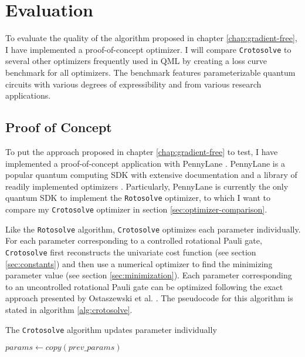\chapter{Evaluation}
\label{chap:evaluation}

To evaluate the quality of the algorithm proposed in chapter
\ref{chap:gradient-free}, I have implemented a proof-of-concept optimizer.
I will compare \texttt{Crotosolve} to several other optimizers frequently used
in QML by creating a loss curve benchmark for all optimizers.
The benchmark features parameterizable quantum circuits with various degrees of
expressibility and from various research applications.

\section{Proof of Concept}
\label{sec:proof-of-concept}
To put the approach proposed in chapter \ref{chap:gradient-free} to test,
I have implemented a proof-of-concept application with PennyLane
\cite{bergholm_pennylane_2022}.
PennyLane is a popular quantum computing SDK with extensive documentation and a
library of readily implemented optimizers \cite{unitary_fund_team_results_2022}.
Particularly, PennyLane is currently the only quantum SDK to implement the
\texttt{Rotosolve} optimizer, to which I want to compare my \texttt{Crotosolve}
optimizer in section \ref{sec:optimizer-comparison}.

Like the \texttt{Rotosolve} algorithm, \texttt{Crotosolve} optimizes each
parameter individually.
For each parameter corresponding to a controlled rotational Pauli gate,
\texttt{Crotosolve} first reconstructs the univariate cost function (see section
\ref{sec:constants}) and then use a numerical optimizer to find the minimizing
parameter value (see section \ref{sec:minimization}).
Each parameter corresponding to an uncontrolled rotational Pauli gate can be
optimized following the exact approach presented by Ostaszewski et al.
\cite{ostaszewski_structure_2021}.
The pseudocode for this algorithm is stated in algorithm \ref{alg:crotosolve}.

\begin{algorithm}
    \caption{The \texttt{Crotosolve} algorithm updates parameter individually}
    \label{alg:crotosolve}
    \BlankLine
    $params \gets copy(prev\_params)$\;
\end{algorithm}

